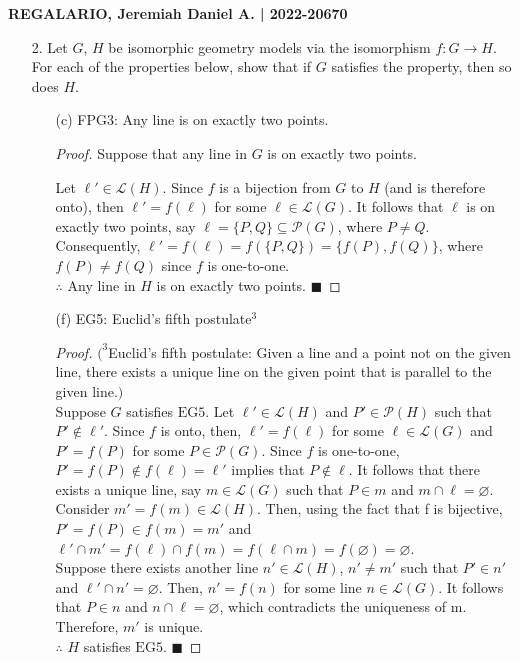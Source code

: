 \documentclass[a4paper, 10pt]{exam}
\begin{document}
\textbf{REGALARIO, Jeremiah Daniel A. | 2022-20670}
\begin{enumerate}
    
    \item[2.] Let $G$, $H$ be isomorphic geometry models via the isomorphism $f: G \to H$. For each of the properties below, show that if $G$ satisfies the property, then so does $H$.
    \begin{enumerate}
        
        \item[(c)] FPG3: Any line is on exactly two points.
        \begin{proof}
            Suppose that any line in $G$ is on exactly two points.

            Let $\ell' \in \mathscr{L}(H)$. Since $f$ is a bijection from $G$ to $H$ (and is therefore onto), then $\ell' = f(\ell)$ for some $\ell \in \mathscr{L}(G)$. It follows that $\ell$ is on exactly two points, say $\ell = \{P, Q\} \subseteq \mathscr{P}(G)$, where $P \neq Q$. Consequently, $\ell' = f(\ell) = f(\{P, Q\}) = \{f(P), f(Q)\}$, where $f(P) \neq f(Q)$ since $f$ is one-to-one. \\
    
            $\therefore$ Any line in $H$ is on exactly two points. $\blacksquare$
        \end{proof}
        
        \item[(f)] EG5: Euclid’s fifth postulate$^3$
        \begin{proof}
        $(^3$Euclid’s fifth postulate: Given a line and a point not on the given line, there exists a unique line
on the given point that is parallel to the given line.$)$ \\

       Suppose $ G $ satisfies $\text{EG5}$. Let $\ell' \in \mathscr{ L }(H)$ and $P' \in \mathscr{P}(H)$ such that $P' \not\in \ell'$. Since $f$ is onto, then, $\ell' = f(\ell)$ for some $\ell \in \mathscr{L}(G)$ and $P' = f(P)$ for some $P \in \mathscr{P}(G)$. Since $f$ is one-to-one, $P' = f(P) \not\in f(\ell) = \ell'$ implies that $P \not\in \ell$. It follows that there exists a unique line, say $m \in \mathscr{L}(G)$ such that $P \in m$ and $m \cap \ell = \varnothing.$ Consider $m' = f(m) \in \mathscr{L}(H)$. Then, using the fact that f is bijective, $P' = f(P) \in f(m) = m'$ and $\ell' \cap m' = f(\ell) \cap f(m) = f(\ell \cap m) = f(\varnothing) = \varnothing$. \\

       Suppose there exists another line $n' \in \mathscr{L}(H)$,  $n' \neq m'$ such that $P' \in n'$ and $\ell' \cap n' = \varnothing$. Then, $n' = f(n)$ for some line $n \in \mathscr{L}(G)$. It follows that $P \in n$ and $n \cap \ell = \varnothing$, which contradicts the uniqueness of m. Therefore, $m'$ is unique. \\

       $\therefore$ $H$ satisfies $\text{EG5}$. $\blacksquare$
        \end{proof}
    \end{enumerate}
    
    
\end{enumerate}
\end{document}
